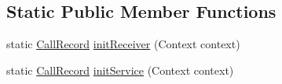 \subsection*{Static Public Member Functions}
\begin{DoxyCompactItemize}
\item 
static \hyperlink{classcom_1_1aykuttasil_1_1callrecord_1_1_call_record}{Call\+Record} \hyperlink{classcom_1_1aykuttasil_1_1callrecord_1_1_call_record_acf60d04b55e69ddc6489a2c0e06a2f36}{init\+Receiver} (Context context)
\item 
static \hyperlink{classcom_1_1aykuttasil_1_1callrecord_1_1_call_record}{Call\+Record} \hyperlink{classcom_1_1aykuttasil_1_1callrecord_1_1_call_record_a58717cda16f688a875a0e32f03d3dbbc}{init\+Service} (Context context)
\end{DoxyCompactItemize}
